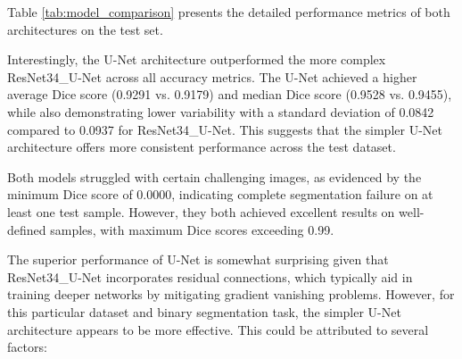 \documentclass[twocolumn,a4paper]{article}
\begin{document}
Table \ref{tab:model_comparison} presents the detailed performance metrics of both architectures on the test set.
\begin{table}[h]
\centering
\caption{\textbf{Performance comparison of U-Net and ResNet34\_U-Net architectures.} Both models were trained with data augmentation, OneCycleLR scheduler, and identical hyperparameters.}
\label{tab:model_comparison}
\end{table}

Interestingly, the U-Net architecture outperformed the more complex ResNet34\_U-Net across all accuracy metrics. The U-Net achieved a higher average Dice score (0.9291 vs. 0.9179) and median Dice score (0.9528 vs. 0.9455), while also demonstrating lower variability with a standard deviation of 0.0842 compared to 0.0937 for ResNet34\_U-Net. This suggests that the simpler U-Net architecture offers more consistent performance across the test dataset.

Both models struggled with certain challenging images, as evidenced by the minimum Dice score of 0.0000, indicating complete segmentation failure on at least one test sample. However, they both achieved excellent results on well-defined samples, with maximum Dice scores exceeding 0.99.

The superior performance of U-Net is somewhat surprising given that ResNet34\_U-Net incorporates residual connections, which typically aid in training deeper networks by mitigating gradient vanishing problems. However, for this particular dataset and binary segmentation task, the simpler U-Net architecture appears to be more effective. This could be attributed to several factors:
\end{document}
